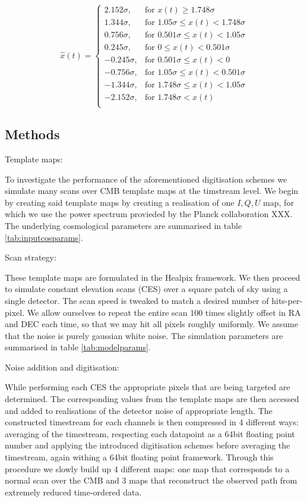 \documentclass[apj]{emulateapj}
\begin{document}
\[ \hat{x}(t) = \left\{ \begin{array}{lr}
2.152 \sigma, & \text{for } x(t) \geq 1.748 \sigma\\
1.344 \sigma, & \text{for } 1.05 \sigma \leq x(t) < 1.748 \sigma\\
0.756 \sigma, & \text{for } 0.501 \sigma \leq x(t) < 1.05 \sigma\\
0.245 \sigma, & \text{for } 0 \leq x(t) < 0.501 \sigma\\
-0.245 \sigma, & \text{for } 0.501 \sigma \leq x(t) < 0\\
-0.756 \sigma, & \text{for } 1.05 \sigma \leq x(t) < 0.501 \sigma\\
-1.344 \sigma, & \text{for } 1.748 \sigma \leq x(t) < 1.05 \sigma\\
-2.152 \sigma, & \text{for } 1.748 \sigma < x(t)\\
\end{array} \right. \]


\subsection{Methods}
\label{subsec:method}

Template maps:

To investigate the performance of the aforementioned digitisation schemes we simulate many scans over CMB template maps at the timstream level. We begin by creating said template maps by creating a realisation of one $I, Q, U$ map, for which we use the power spectrum provieded by the Planck collaboration XXX. The underlying cosmological parameters are summarised in table \ref{tab:inputcosparams}.

Scan strategy:

These template maps are formulated in the Healpix framework. We then proceed to simulate constant elevation scans (CES) over a square patch of sky using a single detector. The scan speed is tweaked to match a desired number of hits-per-pixel. We allow ourselves to repeat the entire scan 100 times slightly offset in RA and DEC each time, so that we may hit all pixels roughly uniformly. We assume that the noise is purely gaussian white noise. The simulation parameters are summarised in table \ref{tab:modelparams}.

Noise addition and digitisation:

While performing each CES the appropriate pixels that are being targeted are determined. The corresponding values from the template maps are then accessed and added to realisations of the detector noise of appropriate length. The constructed timestream for each channels is then compressed in 4 different ways: averaging of the timestream, respecting each datapoint as a 64bit floating point number and applying the introduced digitisation schemes before averaging the timestream, again withing a 64bit floating point framework. Through this procedure we slowly build up 4 different maps: one map that corresponds to a normal scan over the CMB and 3 maps that reconstruct the observed path from extremely reduced time-ordered data.
\end{document}
